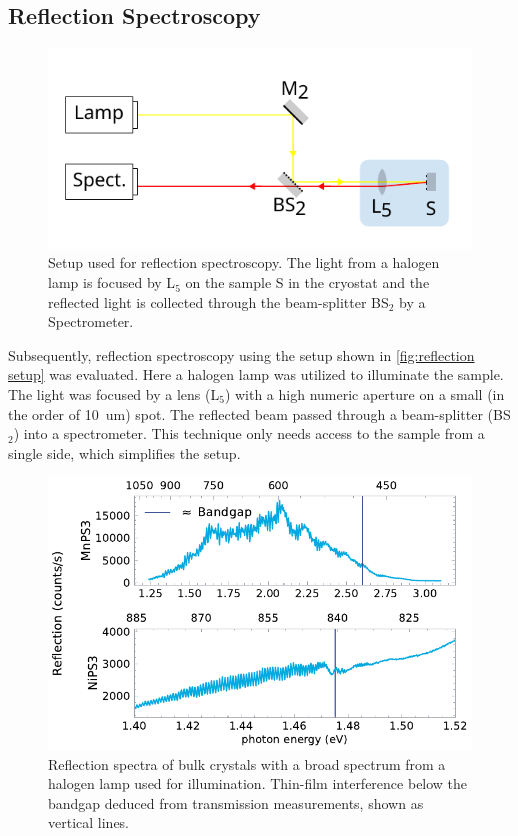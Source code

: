 \documentclass[
	twoside,
	parskip=half,
	a4paper,
]{scrbook}
\begin{document}
\subsection{Reflection Spectroscopy}
\begin{figure}
	\centering
	\includegraphics{../figures/setup_reflection.pdf}
	\caption{Setup used for reflection spectroscopy. The light from a halogen lamp is focused by L$_5$ on the sample S in the cryostat and the reflected light is collected through the beam-splitter BS$_2$ by a Spectrometer.}
	\label{fig:reflection setup}
\end{figure}
Subsequently, reflection spectroscopy using the setup shown in \autoref{fig:reflection setup} was evaluated.
Here a halogen lamp was utilized to illuminate the sample.
The light was focused by a lens (L$_5$) with a high numeric aperture on a small (in the order of \SI{10}{um}) spot.
The reflected beam passed through a beam-splitter (BS$_2$) into a spectrometer.
This technique only needs access to the sample from a single side, which simplifies the setup.
\begin{figure}
	\centering
	\includegraphics{../figures/2024-03-14 reflection spectra.pdf}
	\caption{Reflection spectra of bulk crystals with a broad spectrum from a halogen lamp used for illumination. Thin-film interference below the bandgap deduced from transmission measurements, shown as vertical lines.}
	\label{fig:reflection spectra}
\end{figure}
\end{document}
